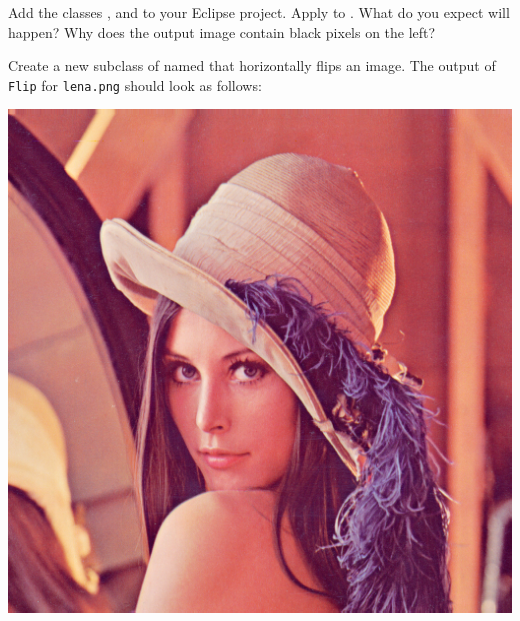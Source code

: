 \documentclass{book}
\begin{document}
\begin{exercise}
Add the classes ,  and  to your Eclipse project. Apply  to . What do you expect will happen? Why does the output image contain black pixels on the left?
\end{exercise}

\begin{exercise}
Create a new subclass of  named  that horizontally flips an image. The output of \texttt{Flip} for \texttt{lena.png} should look as follows:
\begin{center}
\includegraphics[scale=0.2]{lena-flipped-horizontally.png}
\end{center} 
\end{exercise}
\end{document}
